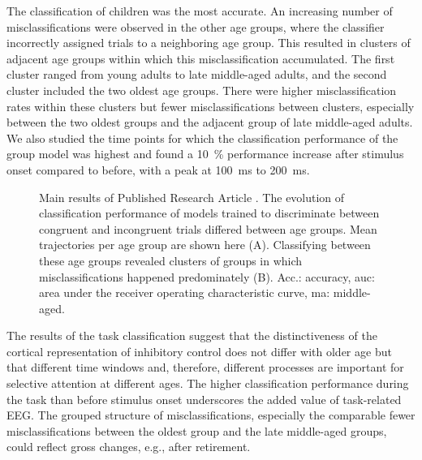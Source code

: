 The classification of children was the most accurate. An increasing number of misclassifications were observed in the other age groups, where the classifier incorrectly assigned trials to a neighboring age group. This resulted in clusters of adjacent age groups within which this misclassification accumulated. The first cluster ranged from young adults to late middle-aged adults, and the second cluster included the two oldest age groups. There were higher misclassification rates within these clusters but fewer misclassifications between clusters, especially between the two oldest groups and the adjacent group of late middle-aged adults.\\
We also studied the time points for which the classification performance of the group model was highest and found a 10~\% performance increase after stimulus onset compared to before, with a peak at 100~ms to 200~ms.

\begin{figure}[h]
\begin{center}

\captionsetup{justification=justified}
\caption[Main results of Published Research Article ]{Main results of Published Research Article . The evolution of classification performance of models trained to discriminate between congruent and incongruent trials differed between age groups. Mean trajectories per age group are shown here (A). Classifying between these age groups revealed clusters of groups in which misclassifications happened predominately (B). Acc.: accuracy, \gls{auc}: area under the receiver operating characteristic curve, ma: middle-aged.}
\label{fig:results2}
\end{center}
\end{figure}
\noindent The results of the task classification suggest that the distinctiveness of the cortical representation of inhibitory control does not differ with older age but that different time windows and, therefore, different processes are important for selective attention at different ages. The higher classification performance during the task than before stimulus onset underscores the added value of task-related EEG. The grouped structure of misclassifications,  especially the comparable fewer misclassifications between the oldest group and the late middle-aged groups, could reflect gross changes, e.g., after retirement. 


